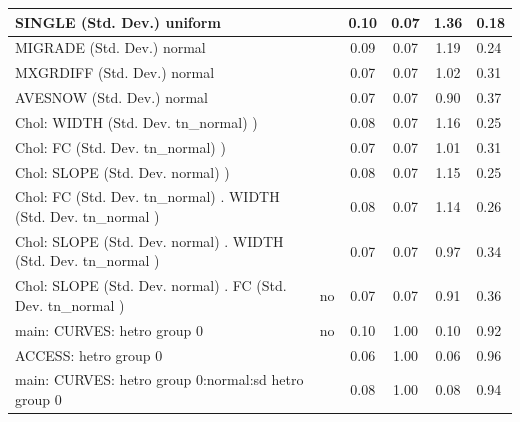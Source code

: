 \begin{table}
\begin{center}
\begin{tabular}{|l|l|c|c|c|l|}
			\hline
			SINGLE (Std. Dev.) uniform &  & 0.10 & 0.07 & 1.36 & 0.18 \\
			\hline
			MIGRADE (Std. Dev.) normal &  & 0.09 & 0.07 & 1.19 & 0.24 \\
			\hline
			MXGRDIFF (Std. Dev.) normal &  & 0.07 & 0.07 & 1.02 & 0.31 \\
			\hline
			AVESNOW (Std. Dev.) normal &  & 0.07 & 0.07 & 0.90 & 0.37 \\
			\hline
			 Chol: WIDTH (Std. Dev. tn_normal) ) &  & 0.08 & 0.07 & 1.16 & 0.25 \\
			\hline
			 Chol: FC (Std. Dev. tn_normal) ) &  & 0.07 & 0.07 & 1.01 & 0.31 \\
			\hline
			 Chol: SLOPE (Std. Dev. normal) ) &  & 0.08 & 0.07 & 1.15 & 0.25 \\
			\hline
			 Chol: FC (Std. Dev. tn_normal) . WIDTH (Std. Dev.   tn_normal ) &  & 0.08 & 0.07 & 1.14 & 0.26 \\
			\hline
			 Chol: SLOPE (Std. Dev. normal) . WIDTH (Std. Dev.   tn_normal ) &  & 0.07 & 0.07 & 0.97 & 0.34 \\
			\hline
			 Chol: SLOPE (Std. Dev. normal) . FC (Std. Dev.   tn_normal ) & no & 0.07 & 0.07 & 0.91 & 0.36 \\
			\hline
			main: CURVES: hetro group 0 & no & 0.10 & 1.00 & 0.10 & 0.92 \\
			\hline
			ACCESS: hetro group 0 &  & 0.06 & 1.00 & 0.06 & 0.96 \\
			\hline
			main: CURVES: hetro group 0:normal:sd  hetro group 0 &  & 0.08 & 1.00 & 0.08 & 0.94 \\
			\hline
		\end{tabular}
	\end{center}
\end{table}